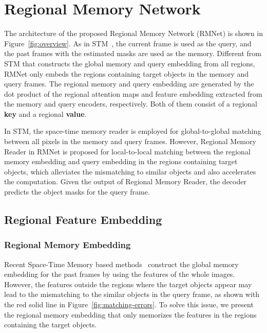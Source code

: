 \documentclass[final]{cvpr}
\begin{document}
\section{Regional Memory Network}

The architecture of the proposed Regional Memory Network (RMNet) is shown in Figure~\ref{fig:overview}.
As in STM~\cite{DBLP:conf/iccv/OhLXK19}, the current frame is used as the query, and the past frames with the estimated masks are used as the memory.
Different from STM that constructs the global memory and query embedding from all regions, RMNet only embeds the regions containing target objects in the memory and query frames.
The regional memory and query embedding are generated by the dot product of the regional attention maps and feature embedding extracted from the memory and query encoders, respectively.
Both of them consist of a regional \textbf{key} and a regional \textbf{value}.


In STM, the space-time memory reader is employed for global-to-global matching between all pixels in the memory and query frames.
However, Regional Memory Reader in RMNet is proposed for local-to-local matching between the regional memory embedding and query embedding in the regions containing target objects, which alleviates the mismatching to similar objects and also accelerates the computation.
Given the output of Regional Memory Reader, the decoder predicts the object masks for the query frame.

\subsection{Regional Feature Embedding}

\subsubsection{Regional Memory Embedding}
\label{sec:regional-memory-embedding}

Recent Space-Time Memory based methods~\cite{DBLP:conf/eccv/LuWDZSG20,DBLP:conf/iccv/OhLXK19,DBLP:conf/eccv/SeongHK20} construct the global memory embedding for the past frames by using the features of the whole images.
However, the features outside the regions where the target objects appear may lead to the mismatching to the similar objects in the query frame, as shown with the red solid line in Figure~\ref{fig:matching-errors}.
To solve this issue, we present the regional memory embedding that only memorizes the features in the regions containing the target objects.
\end{document}
